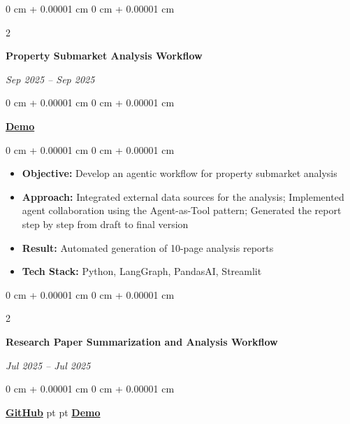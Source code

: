 \documentclass[10pt, letterpaper]{article}
\newenvironment{highlights}{
    \begin{itemize}[
        topsep=0.10 cm,
        parsep=0.10 cm,
        partopsep=0pt,
        itemsep=0pt,
        leftmargin=0 cm + 10pt
    ]
}{
    \end{itemize}
} %
\newenvironment{onecolentry}{
    \begin{adjustwidth}{
        0 cm + 0.00001 cm
    }{
        0 cm + 0.00001 cm
    }
}{
    \end{adjustwidth}
} %
\newenvironment{twocolentry}[2][]{
    \onecolentry
    \def\secondColumn{\textit{#2}}
    \setcolumnwidth{\fill, 4.5 cm}
    \begin{paracol}{2}
}{
    \switchcolumn \raggedleft \secondColumn
    \end{paracol}
    \endonecolentry
} %
\begin{document}
        \vspace{0.2 cm}
        \begin{twocolentry}{
            Sep 2025 -- Sep 2025
        }
            \textbf{Property Submarket Analysis Workflow}
        \end{twocolentry}
        \begin{onecolentry}
            \href{https://drive.google.com/file/d/1je_dNIa4m8z-_xLycZlDLBLdY-o0ZeNk/view?usp=sharing}{\textbf{Demo}}
        \end{onecolentry}

        \vspace{0.10 cm}
        \begin{onecolentry}
            \begin{highlights}
                \item \textbf{Objective:} Develop an agentic workflow for property submarket analysis
                \item \textbf{Approach:} Integrated external data sources for the analysis; Implemented agent collaboration using the Agent-as-Tool pattern; Generated the report step by step from draft to final version
                \item \textbf{Result:} Automated generation of 10-page analysis reports
                \item \textbf{Tech Stack:} Python, LangGraph, PandasAI, Streamlit
            \end{highlights}
        \end{onecolentry}

        \vspace{0.2 cm}
        \begin{twocolentry}{
            Jul 2025 -- Jul 2025
        }
            \textbf{Research Paper Summarization and Analysis Workflow}
        \end{twocolentry}
        \begin{onecolentry}
            \href{https://github.com/kyoui-dev/research-paper-summarization-and-analysis}{\textbf{GitHub}}
             pt
            \AND
             pt
            \href{https://drive.google.com/file/d/1kHaHzc9Fv7R84VMxt86rZcnPEK1P3vAe/view?usp=sharing}{\textbf{Demo}}
        \end{onecolentry}
\end{document}
